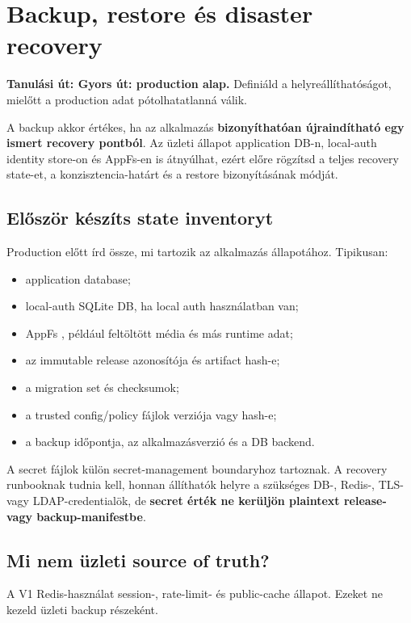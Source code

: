 \chapter{Backup, restore és disaster recovery}\label{ch:recovery}

\noindent\textbf{Tanulási út: Gyors út: production alap.} Definiáld a helyreállíthatóságot, mielőtt a production adat pótolhatatlanná válik.\par\medskip

A backup akkor értékes, ha az alkalmazás \textbf{bizonyíthatóan újraindítható egy ismert recovery pontból}. Az üzleti állapot application DB-n, local-auth identity store-on és AppFs-en is átnyúlhat, ezért előre rögzítsd a teljes recovery state-et, a konzisztencia-határt és a restore bizonyításának módját.

\section{Először készíts state inventoryt}

Production előtt írd össze, mi tartozik az alkalmazás állapotához. Tipikusan:

\begin{itemize}
  \item application database;
  \item local-auth SQLite DB, ha local auth használatban van;
  \item AppFs , például feltöltött média és más runtime adat;
  \item az immutable release azonosítója és artifact hash-e;
  \item a migration set és checksumok;
  \item a trusted config/policy fájlok verziója vagy hash-e;
  \item a backup időpontja, az alkalmazásverzió és a DB backend.
\end{itemize}

A secret fájlok külön secret-management boundaryhoz tartoznak. A recovery runbooknak tudnia kell, honnan állíthatók helyre a szükséges DB-, Redis-, TLS- vagy LDAP-credentialök, de \textbf{secret érték ne kerüljön plaintext release- vagy backup-manifestbe}.

\section{Mi nem üzleti source of truth?}

A V1 Redis-használat session-, rate-limit- és public-cache állapot. Ezeket ne kezeld üzleti backup részeként.


